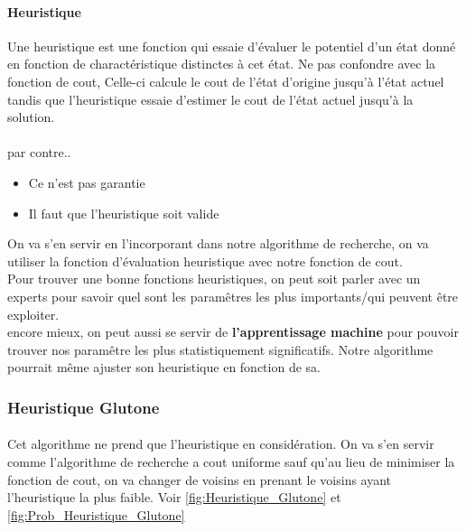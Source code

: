 \documentclass[oneside]{book}
\begin{document}
\paragraph{Heuristique}
Une heuristique est une fonction qui essaie d'évaluer le potentiel d'un état donné en fonction de charactéristique distinctes à cet état. Ne pas confondre avec la fonction de cout, Celle-ci calcule le cout de l'état d'origine jusqu'à l'état actuel tandis que l'heuristique essaie d'estimer le cout de l'état actuel jusqu'à la solution.
\paragraph{}

par contre..
\begin{itemize}
\item Ce n'est pas garantie
\item Il faut que l'heuristique soit valide
\end{itemize}

On va s'en servir en l'incorporant dans notre algorithme de recherche, on va utiliser la fonction d'évaluation heuristique avec notre fonction de cout.\\

Pour trouver une bonne fonctions heuristiques, on peut soit parler avec un experts pour savoir quel sont les paramêtres les plus importants/qui peuvent être exploiter. \\

encore mieux, on peut aussi se servir de \textbf{l'apprentissage machine} pour pouvoir trouver nos paramêtre les plus statistiquement significatifs. Notre algorithme pourrait même ajuster son heuristique en fonction de sa.

\subsubsection{Heuristique Glutone}
\paragraph{}
Cet algorithme ne prend que l'heuristique en considération. On va s'en servir comme l'algorithme de recherche a cout uniforme sauf qu'au lieu de minimiser la fonction de cout, on va changer de voisins en prenant le voisins ayant l'heuristique la plus faible. Voir \ref{fig:Heuristique_Glutone} et \ref{fig:Prob_Heuristique_Glutone}
\end{document}

